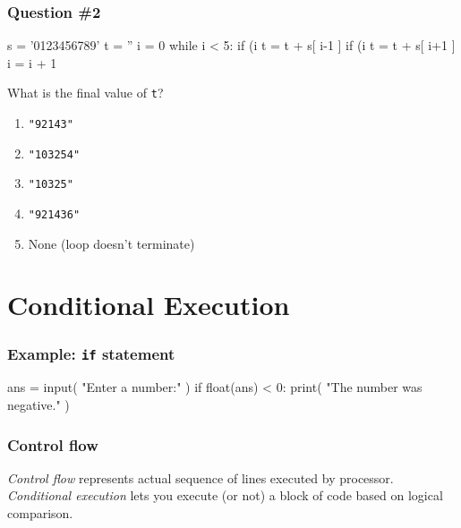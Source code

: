 \documentclass[11pt]{beamer}
\begin{document}
\begin{frame}[fragile]
  \frametitle{Question \#2}
  \Enlarge

  \begin{semiverbatim}
s = '0123456789'
t = ''
i = 0
while i < 5:
    if (i%
        t = t + s[ i-1 ]
    if (i%
        t = t + s[ i+1 ]
    i = i + 1
\end{semiverbatim}
  What is the final value of \texttt{t}?
  \begin{enumerate}[label=\Alph*]
  \item  \texttt{"92143"}
  \item  \texttt{"103254"}
  \item  \texttt{"10325"}
  \item  \texttt{"921436"}
  \item  None (loop doesn't terminate)
  \end{enumerate}
\end{frame}

\section{Conditional Execution}

\begin{frame}[fragile]
  \frametitle{Example:  \texttt{if} statement}
  \Enlarge

  \begin{semiverbatim}
ans = input( "Enter a number:" )
if float(ans) < 0:
    print( "The number was negative." )
  \end{semiverbatim}
\end{frame}

\begin{frame}[fragile]
  \frametitle{Control flow}
  \Enlarge

  \begin{itemize}
  \myitem  \emph{Control flow} represents actual sequence of lines executed by processor. \pause
  \myitem  \emph{Conditional execution} lets you execute (or not) a block of code based on logical comparison.
  \end{itemize}
\end{frame}
\end{document}
